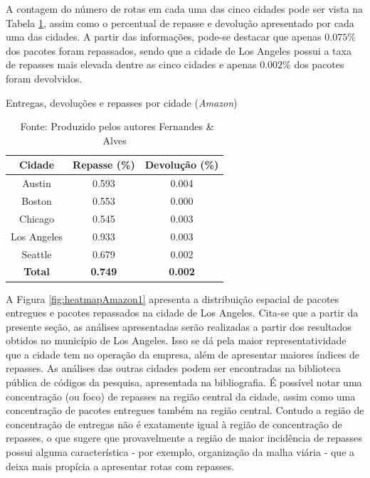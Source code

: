 A contagem do número de rotas em cada uma das cinco cidades pode ser vista na Tabela \ref{tab:resumo_dev_rep_Amazon}, assim como o percentual de repasse e devolução apresentado por cada uma das cidades.
A partir das informações, pode-se destacar que apenas $0.075\%$ dos pacotes foram repassados, sendo que a cidade de Los Angeles possui a taxa de repasses mais elevada dentre as cinco cidades e apenas $0.002\%$ dos pacotes foram devolvidos.

\singlespacing
\begin{table}[H]
    \caption{Entregas, devoluções e repasses por cidade (\textit{Amazon})}
    \label{tab:resumo_dev_rep_Amazon}
    \centering
    \begin{tabular}{|ccc|}
        \hline
        \textbf{Cidade} &
          \textbf{Repasse (\%)} &
          \textbf{Devolução (\%)} \\ \hline
            Austin         & 0.593 & 0.004 \\
            Boston         & 0.553 & 0.000 \\
            Chicago        & 0.545 & 0.003 \\
            Los Angeles    & 0.933 & 0.003 \\
            Seattle        & 0.679 & 0.002 \\ \hline
            \textbf{Total} & \textbf{0.749} & \textbf{0.002} \\ \hline
    \end{tabular}
    \caption*{\ Fonte: Produzido pelos autores Fernandes \& Alves}
\end{table}
\onehalfspacing

A Figura \ref{fig:heatmapAmazon1} apresenta a distribuição espacial de pacotes entregues e pacotes repassados na cidade de Los Angeles. Cita-se que a partir da presente seção, as análises apresentadas serão realizadas a partir dos resultados obtidos no município de Los Angeles. Isso se dá pela maior representatividade que a cidade tem no operação da empresa, além de apresentar maiores índices de repasses. As análises das outras cidades podem ser encontradas na biblioteca pública de códigos da pesquisa, apresentada na bibliografia.
É possível notar uma concentração (ou foco) de repasses na região central da cidade, assim como uma concentração de pacotes entregues também na região central.
Contudo a região de concentração de entregas não é exatamente igual à região de concentração de repasses, o que sugere que provavelmente a região de maior incidência de repasses possui alguma característica - por exemplo, organização da malha viária - que a deixa mais propícia a apresentar rotas com repasses.

